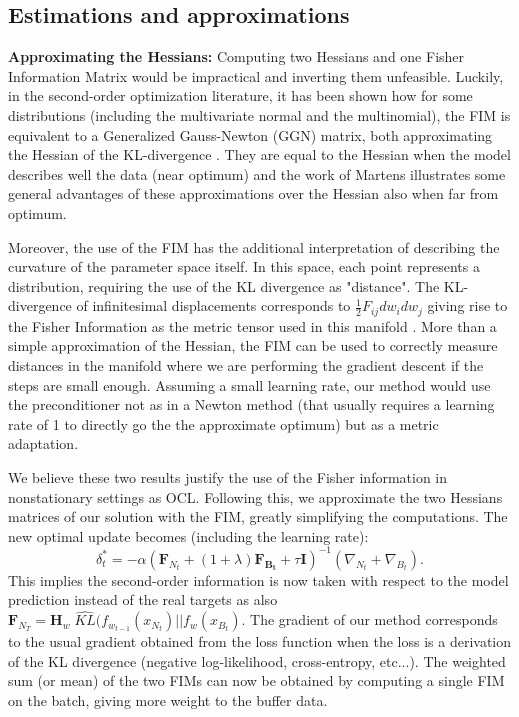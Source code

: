\subsection{Estimations and approximations}
\textbf{Approximating the Hessians: }Computing two Hessians and one Fisher Information Matrix would be impractical and inverting them unfeasible. Luckily, in the second-order optimization literature, it has been shown how for some distributions (including the multivariate normal and the multinomial), the FIM is equivalent to a Generalized Gauss-Newton (GGN) matrix, both approximating the Hessian of the KL-divergence \cite{martens2020new}. They are equal to the Hessian when the model describes well the data (near optimum) and the work of Martens \cite{martens2020new} illustrates some general advantages of these approximations over the Hessian also when far from optimum.

Moreover, the use of the FIM has the additional interpretation of describing the curvature of the parameter space itself. In this space, each point represents a distribution, requiring the use of the KL divergence as "distance". The KL-divergence of infinitesimal displacements corresponds to $\frac{1}{2} F_{ij} d w_i d w_j$  giving rise to the Fisher Information as the metric tensor used in this manifold \cite{amari2016information}. More than a simple approximation of the Hessian, the FIM can be used to correctly measure distances in the manifold where we are performing the gradient descent if the steps are small enough. Assuming a small learning rate, our method would use the preconditioner not as in a Newton method (that usually requires a learning rate of 1 to directly go the the approximate optimum) but as a metric adaptation. 

We believe these two results justify the use of the Fisher information in nonstationary settings as OCL. Following this, we approximate the two Hessians matrices of our solution with the FIM, greatly simplifying the computations. The new optimal update becomes (including the learning rate):
\begin{equation*}
\label{eq:OCAR}
    \delta_t^* = -\alpha (\mathbf{F}_{N_t} + (1 + \lambda) \mathbf{F_{B_t}}+\tau \mathbf{I})^{-1}(\nabla_{N_t} + \nabla_{B_t}).
\end{equation*}
This implies the second-order information is now taken with respect to the model prediction instead of the real targets as also $\mathbf{F}_{N_T} = \mathbf{H}_w \; \hat{KL}(f_{w_{t-1}}(x_{N_t}) || f_{w}(x_{B_t})$. The gradient of our method corresponds to the usual gradient obtained from the loss function when the loss is a derivation of the KL divergence (negative log-likelihood, cross-entropy, etc...). The weighted sum (or mean) of the two FIMs can now be obtained by computing a single FIM on the batch, giving more weight to the buffer data.

